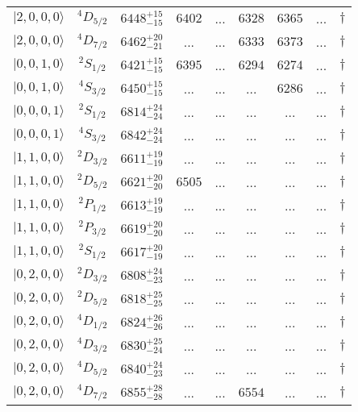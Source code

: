 \begin{tabular}{c c| c c c c c c c}
$\vert 2,0,0,0 \rangle $ & $^{4}D_{5/2}$ & $6448^{+15}_{-15}$ & $6402$ & ... & $6328$ & $6365$ & ... & $\dagger$ \\ 
$\vert 2,0,0,0 \rangle $ & $^{4}D_{7/2}$ & $6462^{+20}_{-21}$ & ... & ... & $6333$ & $6373$ & ... & $\dagger$ \\ 
$\vert 0,0,1,0 \rangle $ & $^{2}S_{1/2}$ & $6421^{+15}_{-15}$ & $6395$ & ... & $6294$ & $6274$ & ... & $\dagger$ \\ 
$\vert 0,0,1,0 \rangle $ & $^{4}S_{3/2}$ & $6450^{+15}_{-15}$ & ... & ... & ... & $6286$ & ... & $\dagger$ \\ 
$\vert 0,0,0,1 \rangle $ & $^{2}S_{1/2}$ & $6814^{+24}_{-24}$ & ... & ... & ... & ... & ... & $\dagger$ \\ 
$\vert 0,0,0,1 \rangle $ & $^{4}S_{3/2}$ & $6842^{+24}_{-24}$ & ... & ... & ... & ... & ... & $\dagger$ \\ 
$\vert 1,1,0,0 \rangle $ & $^{2}D_{3/2}$ & $6611^{+19}_{-19}$ & ... & ... & ... & ... & ... & $\dagger$ \\ 
$\vert 1,1,0,0 \rangle $ & $^{2}D_{5/2}$ & $6621^{+20}_{-20}$ & $6505$ & ... & ... & ... & ... & $\dagger$ \\ 
$\vert 1,1,0,0 \rangle $ & $^{2}P_{1/2}$ & $6613^{+19}_{-19}$ & ... & ... & ... & ... & ... & $\dagger$ \\ 
$\vert 1,1,0,0 \rangle $ & $^{2}P_{3/2}$ & $6619^{+20}_{-20}$ & ... & ... & ... & ... & ... & $\dagger$ \\ 
$\vert 1,1,0,0 \rangle $ & $^{2}S_{1/2}$ & $6617^{+20}_{-19}$ & ... & ... & ... & ... & ... & $\dagger$ \\ 
$\vert 0,2,0,0 \rangle $ & $^{2}D_{3/2}$ & $6808^{+24}_{-23}$ & ... & ... & ... & ... & ... & $\dagger$ \\ 
$\vert 0,2,0,0 \rangle $ & $^{2}D_{5/2}$ & $6818^{+25}_{-25}$ & ... & ... & ... & ... & ... & $\dagger$ \\ 
$\vert 0,2,0,0 \rangle $ & $^{4}D_{1/2}$ & $6824^{+26}_{-26}$ & ... & ... & ... & ... & ... & $\dagger$ \\ 
$\vert 0,2,0,0 \rangle $ & $^{4}D_{3/2}$ & $6830^{+25}_{-24}$ & ... & ... & ... & ... & ... & $\dagger$ \\ 
$\vert 0,2,0,0 \rangle $ & $^{4}D_{5/2}$ & $6840^{+24}_{-23}$ & ... & ... & ... & ... & ... & $\dagger$ \\ 
$\vert 0,2,0,0 \rangle $ & $^{4}D_{7/2}$ & $6855^{+28}_{-28}$ & ... & ... & $6554$ & ... & ... & $\dagger$ \\ 
\hline \hline
\end{tabular}
